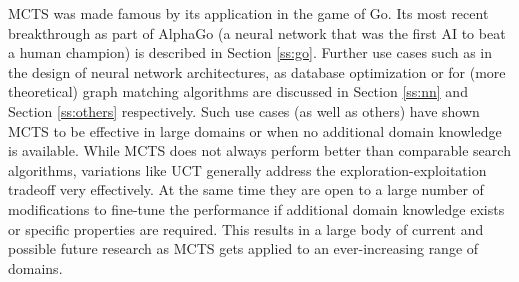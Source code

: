 MCTS was made famous by its application in the game of Go. Its most recent breakthrough as part of AlphaGo \cite{silver2017mastering} (a neural network that was the first AI to beat a human champion) is described in Section \ref{ss:go}. Further use cases such as in the design of neural network architectures, as database optimization or for (more theoretical) graph matching algorithms are discussed in Section \ref{ss:nn} and Section \ref{ss:others} respectively. Such use cases (as well as others) have shown MCTS to be effective in large domains or when no additional domain knowledge is available. While MCTS does not always perform better than comparable search algorithms, variations like UCT generally address the exploration-exploitation tradeoff very effectively. At the same time they are open to a large number of modifications to fine-tune the performance if additional domain knowledge exists or specific properties are required. This results in a large body of current and possible future research as MCTS gets applied to an ever-increasing range of domains.
